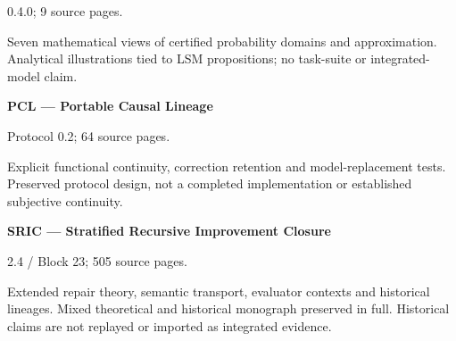 0.4.0; 9 source pages.\par

Seven mathematical views of certified probability domains and approximation. Analytical illustrations tied to LSM propositions; no task-suite or integrated-model claim.\par

\hypertarget{cat:PCL}{}\textbf{PCL --- Portable Causal Lineage}\par

Protocol 0.2; 64 source pages.\par

Explicit functional continuity, correction retention and model-replacement tests. Preserved protocol design, not a completed implementation or established subjective continuity.\par

\hypertarget{cat:SRIC}{}\textbf{SRIC --- Stratified Recursive Improvement Closure}\par

2.4 / Block 23; 505 source pages.\par

Extended repair theory, semantic transport, evaluator contexts and historical lineages. Mixed theoretical and historical monograph preserved in full. Historical claims are not replayed or imported as integrated evidence.\par
